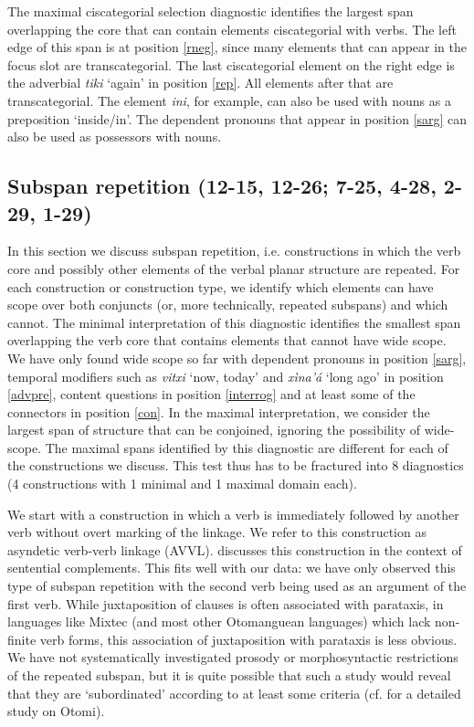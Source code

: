 \documentclass[output=paper]{langscibook}
\begin{document}
The maximal ciscategorial selection diagnostic identifies the largest span overlapping the core that can contain elements ciscategorial with verbs. 
The left edge of this span is at position \ref{rneg}, since many elements that can appear in the focus slot are transcategorial.
The last ciscategorial element on the right edge is the adverbial \textit{tiki} `again' in position \ref{rep}. 
All elements after that are transcategorial. The element \textit{ini}, for example, can also be used with nouns as a preposition `inside/in'. The dependent pronouns that appear in position \ref{sarg} can also be used as possessors with nouns.




\subsection{Subspan repetition (12-15, 12-26; 7-25, 4-28, 2-29, 1-29)} %
\label{sub:subspanrep}

In this section we discuss subspan repetition, i.e. constructions in which the verb core and possibly other elements of the verbal planar structure are repeated. For each construction or construction type, we identify which elements can have scope over both conjuncts (or, more technically, repeated subspans) and which cannot. 
The minimal interpretation of this diagnostic identifies the smallest span overlapping the verb core that contains elements that cannot have wide scope. We have only found wide scope so far with dependent pronouns in position \ref{sarg}, temporal modifiers such as \textit{vitxi} `now, today' and \textit{xìna'á} `long ago' in position \ref{advpre}, content questions in position \ref{interrog} and at least some of the connectors in position \ref{con}. 
In the maximal interpretation, we consider the largest span of structure that can be conjoined, ignoring the possibility of wide-scope. 
The maximal spans identified by this diagnostic are different for each of the constructions we discuss. This test thus has to be fractured into 8 diagnostics (4 constructions with 1 minimal and 1 maximal domain each).

We start with a construction in which a verb is immediately followed by another verb without overt marking of the linkage. We refer to this construction as asyndetic verb-verb linkage (AVVL).
\citet[154--155]{macaulay1996grammar} discusses this construction in the context of sentential complements. This fits well with our data: we have only observed this type of subspan repetition with the second verb being used as an argument of the first verb. 
While juxtaposition of clauses is often associated with parataxis, in languages like Mixtec (and most other Otomanguean languages) which lack non-finite verb forms, this association of juxtaposition with parataxis is less obvious. 
We have not systematically investigated prosody or morphosyntactic restrictions of the repeated subspan, but it is quite possible that such a study would reveal that they are `subordinated' according to at least some criteria (cf. \citealt{palancar2012clausal} for a detailed study on Otomi).
\end{document}
